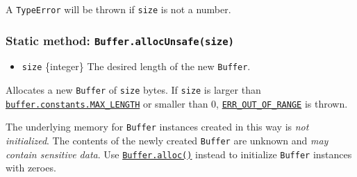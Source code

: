 A \texttt{TypeError} will be thrown if \texttt{size} is not a number.

\subsubsection{\texorpdfstring{Static method:
\texttt{Buffer.allocUnsafe(size)}}{Static method: Buffer.allocUnsafe(size)}}\label{static-method-buffer.allocunsafesize}

\begin{itemize}
\tightlist
\item
  \texttt{size} \{integer\} The desired length of the new
  \texttt{Buffer}.
\end{itemize}

Allocates a new \texttt{Buffer} of \texttt{size} bytes. If \texttt{size}
is larger than
\hyperref[bufferconstantsmax_length]{\texttt{buffer.constants.MAX\_LENGTH}}
or smaller than 0,
\href{errors.md\#err_out_of_range}{\texttt{ERR\_OUT\_OF\_RANGE}} is
thrown.

The underlying memory for \texttt{Buffer} instances created in this way
is \emph{not initialized}. The contents of the newly created
\texttt{Buffer} are unknown and \emph{may contain sensitive data}. Use
\hyperref[static-method-bufferallocsize-fill-encoding]{\texttt{Buffer.alloc()}}
instead to initialize \texttt{Buffer} instances with zeroes.

\begin{Shaded}
\begin{Highlighting}[]
\NormalTok{ \{ }\NormalTok{ \} } \OperatorTok{;}

\OperatorTok{=} \NormalTok{(}\NormalTok{)}\OperatorTok{;}

\OperatorTok{;}

\NormalTok{(}\NormalTok{)}\OperatorTok{;}

\OperatorTok{;}
\end{Highlighting}
\end{Shaded}

